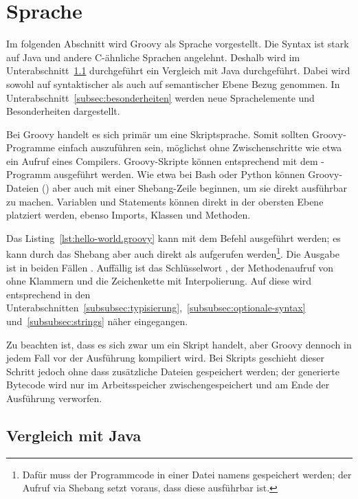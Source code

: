 \section{Sprache}\label{sec:sprache}

Im folgenden Abschnitt wird Groovy als Sprache vorgestellt.
Die Syntax ist stark auf Java und andere C-ähnliche Sprachen angelehnt.
Deshalb wird im Unterabschnitt~\ref{subsec:vergleichMitJava} durchgeführt ein Vergleich mit Java durchgeführt.
Dabei wird sowohl auf syntaktischer als auch auf semantischer Ebene Bezug genommen.
In Unterabschnitt~\ref{subsec:besonderheiten} werden neue Sprachelemente und Besonderheiten dargestellt.

Bei Groovy handelt es sich primär um eine Skriptsprache.
Somit sollten Groovy-Programme einfach auszuführen sein, möglichst ohne Zwischenschritte wie etwa ein Aufruf eines Compilers.
Groovy-Skripte können entsprechend mit dem -Programm ausgeführt werden.
Wie etwa bei Bash oder Python können Groovy-Dateien () aber auch mit einer Shebang-Zeile beginnen, um sie direkt ausführbar zu machen.
Variablen und Statements können direkt in der obersten Ebene platziert werden, ebenso Imports, Klassen und Methoden.


Das Listing~\ref{lst:hello-world.groovy} kann mit dem Befehl  ausgeführt werden;
es kann durch das Shebang aber auch direkt als  aufgerufen werden\footnote{Dafür muss der Programmcode in einer Datei namens  gespeichert werden;
der Aufruf via Shebang setzt voraus, dass diese ausführbar ist.}.
Die Ausgabe ist in beiden Fällen .
Auffällig ist das Schlüsselwort , der Methodenaufruf von  ohne Klammern und die Zeichenkette mit Interpolierung.
Auf diese wird entsprechend in den Unterabschnitten~\ref{subsubsec:typisierung},~\ref{subsubsec:optionale-syntax} und~\ref{subsubsec:strings} näher eingegangen.

Zu beachten ist, dass es sich zwar um ein Skript handelt, aber Groovy dennoch in jedem Fall vor der Ausführung kompiliert wird.
Bei Skripts geschieht dieser Schritt jedoch ohne dass zusätzliche Dateien gespeichert werden;
der generierte Bytecode wird nur im Arbeitsspeicher zwischengespeichert und am Ende der Ausführung verworfen.

\subsection{Vergleich mit Java}\label{subsec:vergleichMitJava}

